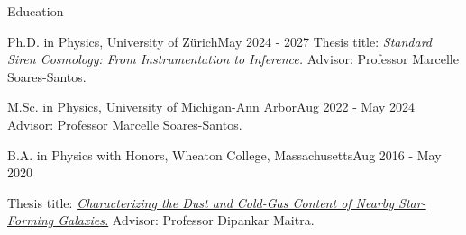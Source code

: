 \begin{rSection}{Education}
\begin{rSubsection}
        {Ph.D. in Physics, University of Zürich}{May 2024 - 2027}{}{}
        Thesis title: \textit{Standard Siren Cosmology: From Instrumentation to Inference.}
        \newline
        Advisor: Professor Marcelle Soares-Santos.
\end{rSubsection}

\begin{rSubsection}
        {M.Sc. in Physics, University of Michigan-Ann Arbor}{Aug 2022 - May 2024}{}{}
        Advisor: Professor Marcelle Soares-Santos.
\end{rSubsection}

\begin{rSubsection}{B.A. in Physics with Honors, Wheaton College, Massachusetts}{Aug 2016 - May 2020}{}{}

    Thesis title: \textit{\href{https://wheatoncollege.as.atlas-sys.com/repositories/2/archival_objects/21957}{Characterizing the Dust and Cold-Gas Content of Nearby Star-Forming Galaxies.}}
    \newline
    Advisor: Professor Dipankar Maitra.

\end{rSubsection}

\end{rSection}
